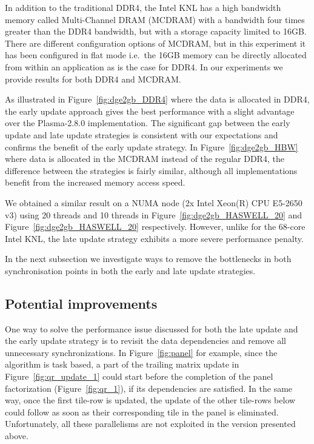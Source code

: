 In addition to the traditional DDR4, the Intel KNL has a high
bandwidth memory called Multi-Channel DRAM (MCDRAM) with a
bandwidth four times greater than the DDR4 bandwidth,
but with a storage capacity limited to 16GB.
There are different configuration options
of MCDRAM, but in this experiment it has been configured
in flat mode i\@.e\@.~the 16GB memory can be directly allocated from within
an application as is the case for DDR4.
In our experiments we provide results for both DDR4 and MCDRAM.

As illustrated in Figure~\ref{fig:dge2gb_DDR4} where the data is
allocated in DDR4, the early update approach gives the best
performance with a slight advantage over the Plasma-2.8.0
implementation.
The significant gap between the early update and late update
strategies is consistent with our expectations
and confirms the benefit of the early update strategy.
In Figure~\ref{fig:dge2gb_HBW} where data is allocated in
the MCDRAM instead of the regular DDR4, the difference between the
strategies is fairly similar,
although all implementations benefit from the increased memory access
speed.

We obtained a similar result on a NUMA node (2x Intel Xeon(R)
CPU E5-2650 v3) using 20 threads and 10 threads in
Figure~\ref{fig:dge2gb_HASWELL_20} and
Figure~\ref{fig:dge2gb_HASWELL_20} respectively.
However, unlike for the 68-core Intel KNL,
the late update strategy exhibits a more severe
performance penalty.

In the next subsection we investigate ways to remove
the bottlenecks in both synchronisation points in both
the early and late update strategies.

\subsection{Potential improvements}
One way to solve the performance issue discussed for both the
late update and the early update strategy is to revisit the
data dependencies and remove all unnecessary synchronizations.
In Figure~\ref{fig:panel} for example,
since the algorithm is task based,
a part of the trailing matrix update in Figure~\ref{fig:qr_update_1}
could start before the completion of the panel factorization
(Figure~\ref{fig:qr_1}), if its dependencies are satisfied.
In the same way,
once the first tile-row is updated,
the update of the other tile-rows below could follow as
soon as their corresponding tile in the panel is eliminated.
Unfortunately, all these parallelisms are not exploited
in the version presented above.

